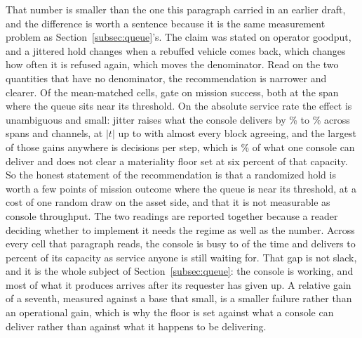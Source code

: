 \documentclass[11pt]{article}
\begin{document}
That number is smaller than the one this paragraph carried in an earlier draft, and the difference is worth a sentence because it is the same measurement problem as Section~\ref{subsec:queue}'s. The claim was stated on operator goodput, and a jittered hold changes when a rebuffed vehicle comes back, which changes how often it is refused again, which moves the denominator. Read on the two quantities that have no denominator, the recommendation is narrower and clearer. Of the \jcSuccCells{} mean-matched cells, \jcSuccGated{} gate on mission success, both at the span where the queue sits near its threshold. On the absolute service rate the effect is unambiguous and small: jitter raises what the console delivers by \jcMemRelLo\% to \jcGeRelHi\% across spans and channels, at $|t|$ up to \jcMemMaxT{} with almost every block agreeing, and the largest of those gains anywhere is \jcMemMax{} decisions per step, which is \jcMemMaxShare\% of what one console can deliver and does not clear a materiality floor set at six percent of that capacity. So the honest statement of the recommendation is that a randomized hold is worth a few points of mission outcome where the queue is near its threshold, at a cost of one random draw on the asset side, and that it is not measurable as console throughput. The two readings are reported together because a reader deciding whether to implement it needs the regime as well as the number. Across every cell that paragraph reads, the console is busy \utLo{} to \utHi{} of the time and delivers \utShareLo{} to \utShareHi{} percent of its capacity as service anyone is still waiting for. That gap is not slack, and it is the whole subject of Section~\ref{subsec:queue}: the console is working, and most of what it produces arrives after its requester has given up. A relative gain of a seventh, measured against a base that small, is a smaller failure rather than an operational gain, which is why the floor is set against what a console can deliver rather than against what it happens to be delivering.
\end{document}
